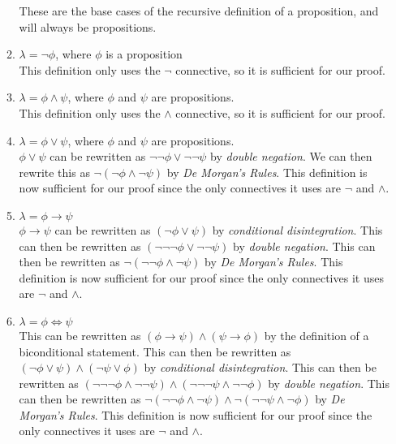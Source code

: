 \documentclass[11pt,a4paper]{article}
\begin{document}
\begin{enumerate}
\begin{enumerate}
        These are the base cases of the recursive definition of a proposition, and will always be propositions.
        \item 
        $\lambda = \neg \phi$, where $\phi$ is a proposition \\
        This definition only uses the $\neg$ connective, so it is sufficient for our proof.
        \item 
        $\lambda = \phi \land \psi$, where $\phi$ and $\psi$ are propositions. \\
        This definition only uses the $\land$ connective, so it is sufficient for our proof.
        \item 
        $\lambda = \phi \lor \psi$, where $\phi$ and $\psi$ are propositions. \\
        $\phi \lor \psi$ can be rewritten as $\neg \neg \phi \lor \neg \neg \psi$ by \emph{double negation}. We can then rewrite this as $\neg (\neg \phi \land \neg \psi)$ by \emph{De Morgan's Rules}. This definition is now sufficient for our proof since the only connectives it uses are $\neg$ and $\land$.
        \item
        $\lambda = \phi \rightarrow \psi$ \\
        $\phi \rightarrow \psi$  can be rewritten as $(\neg \phi \lor \psi)$ by \emph{conditional disintegration}. This can then be rewritten as $(\neg \neg \neg \phi \lor \neg \neg \psi)$ by \emph{double negation}. This can then be rewritten as $\neg (\neg \neg \phi \land \neg \psi)$ by \emph{De Morgan's Rules}. This definition is now sufficient for our proof since the only connectives it uses are $\neg$ and $\land$. 
        \item
        $\lambda = \phi \iff \psi$ \\
        This can be rewritten as $(\phi \rightarrow \psi) \land (\psi \rightarrow \phi)$ by the definition of a biconditional statement. This can then be rewritten as $(\neg \phi \lor \psi) \land (\neg \psi \lor \phi)$ by \emph{conditional disintegration}. This can then be rewritten as $(\neg \neg \neg \phi \land \neg \neg \psi) \land (\neg \neg \neg \psi \land \neg \neg \phi)$ by \emph{double negation}. This can then be rewritten as $\neg (\neg \neg \phi \land \neg \psi) \land \neg (\neg \neg \psi \land \neg \phi)$ by \emph{De Morgan's Rules}. This definition is now sufficient for our proof since the only connectives it uses are $\neg$ and $\land$. 


\end{enumerate}
\end{enumerate}
\end{document}

